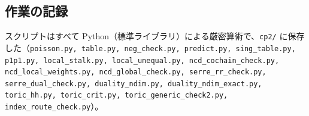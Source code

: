 \subsection{作業の記録}
スクリプトはすべて Python（標準ライブラリ）による厳密算術で、\texttt{cp2/} に保存した（\texttt{poisson.py, table.py, neg\_check.py, predict.py, sing\_table.py, p1p1.py, local\_stalk.py, local\_unequal.py, ncd\_cochain\_check.py, ncd\_local\_weights.py, ncd\_global\_check.py, serre\_rr\_check.py, serre\_dual\_check.py, duality\_ndim.py, duality\_ndim\_exact.py, toric\_hh.py, toric\_crit.py, toric\_generic\_check2.py, index\_route\_check.py}）。

